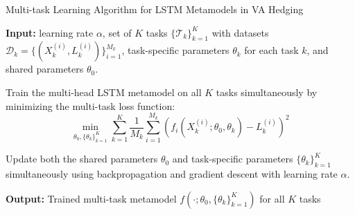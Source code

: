 \documentclass[9pt,handout]{beamer}
\begin{document}
\begin{frame}{Multi-task Learning Algorithm for LSTM Metamodels in VA Hedging}

    \begin{algorithm}[H]
        \caption{Multi-task Learning Algorithm for LSTM Metamodels in VA Hedging}
        \begin{algorithmic}[1] \label{alg3:multiTaskLearning}
            \STATE \textbf{Input:} learning rate $\alpha$, set of $K$ tasks $\{\mathcal{T}_k\}_{k=1}^K$ with datasets $\mathcal{D}_k = \{(X_k^{(i)}, L_k^{(i)})\}_{i=1}^{M_k}$, task-specific parameters $\theta_k$ for each task $k$, and shared parameters $\theta_0$.
        
            \STATE Train the multi-head LSTM metamodel on all $K$ tasks simultaneously by minimizing the multi-task loss function:
            \begin{equation} \label{eq3:multiTaskLoss}
                \min_{\theta_0, \{\theta_k\}_{k=1}^K} \sum_{k=1}^K \frac{1}{M_k} \sum_{i=1}^{M_k} \left( f_i(X_k^{(i)}; \theta_0, \theta_k) - L_k^{(i)} \right)^2
            \end{equation}
        
            \STATE Update both the shared parameters $\theta_0$ and task-specific parameters $\{\theta_k\}_{k=1}^K$ simultaneously using backpropagation and gradient descent with learning rate $\alpha$.
            
            \STATE \textbf{Output:} Trained multi-task metamodel $f(\cdot; \theta_0, \{\theta_k\}_{k=1}^K)$ for all $K$ tasks
        \end{algorithmic}
    \end{algorithm}

\end{frame}
\end{document}
